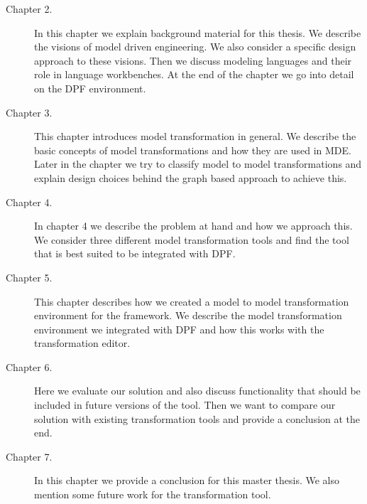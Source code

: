\begin{description}
  \item[Chapter 2.] In this chapter we explain background material for
  this thesis. We describe the visions of model driven engineering. We also
  consider a specific design approach to these visions. Then we discuss modeling
  languages and their role in language workbenches. At the end of the chapter we
  go into detail on the DPF environment. 
  
  \item[Chapter 3.] This chapter introduces model transformation in general. We
  describe the basic concepts of model transformations and how they are used in
  MDE. Later in the chapter we try to classify model to model transformations
  and explain design choices behind the graph based approach to achieve this.
  
  
  \item[Chapter 4.] In chapter 4 we describe the problem at hand and how we
  approach this. We consider three different model transformation tools and
  find the tool that is best suited to be integrated with DPF.
  
  
  \item[Chapter 5.] This chapter describes how we created a model
  to model transformation environment for the framework. We describe the model
  transformation environment we integrated with DPF and how this works with the
  transformation editor. 
  
  
  \item[Chapter 6.] Here we evaluate our solution and also discuss
  functionality that should be included in future versions of the tool. Then we
  want to compare our solution with existing transformation tools and provide a
  conclusion at the end. 
  
  \item[Chapter 7.] In this chapter we provide a conclusion for this master
  thesis. We also mention some future work for the transformation tool. 
\end{description}
